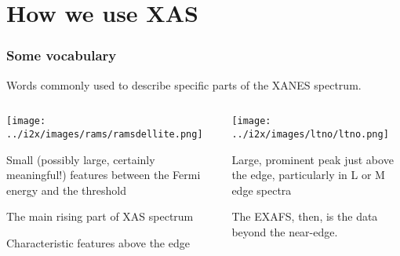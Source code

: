 \documentclass[10pt, xcolor=x11names, compress]{beamer}
\begin{document}
\section{How we use XAS}

\begin{frame}
  \frametitle{Some vocabulary}
  Words commonly used to describe specific parts of the XANES spectrum.

  \begin{columns}[T]
    \begin{column}{0.5\linewidth}
      \texttt{[image: ../i2x/images/rams/ramsdellite.png]}

      \small

      \begin{description}[edge]
      \item[{\color{red}pre-edge}] Small (possibly large, certainly
        meaningful!) features between the Fermi energy and the
        threshold
      \item[{\color{DarkOrchid2}edge}] The main rising part of XAS spectrum
      \item[{\color{Green4}near-edge}] Characteristic features above the edge
      \end{description}
    \end{column}    
    \begin{column}{0.5\linewidth}
      \texttt{[image: ../i2x/images/ltno/ltno.png]}

      \begin{description}[wh]
      \item[{\color{Blue3}white line}] Large, prominent peak just
        above the edge, particularly in L or M edge spectra
      \end{description}

      \bigskip

      \begin{block}{}
        The EXAFS, then, is the data beyond the
        {\color{Green4}near-edge}.
      \end{block}
    \end{column}    
  \end{columns}
\end{frame}
\end{document}
